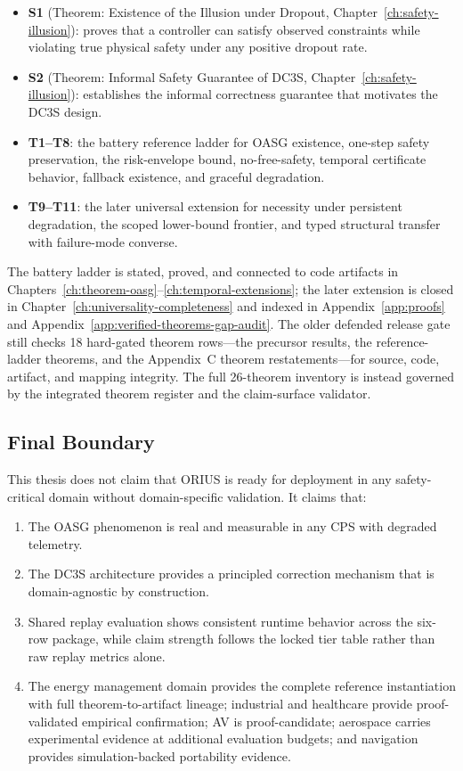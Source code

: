 \begin{itemize}
  \item \textbf{S1} (Theorem: Existence of the Illusion under Dropout,
    Chapter~\ref{ch:safety-illusion}): proves that a
    controller can satisfy observed constraints while violating true
    physical safety under any positive dropout rate.
  \item \textbf{S2} (Theorem: Informal Safety Guarantee of DC3S,
    Chapter~\ref{ch:safety-illusion}): establishes the
    informal correctness guarantee that motivates the DC3S design.
  \item \textbf{T1--T8}: the battery reference ladder for OASG existence,
    one-step safety preservation, the risk-envelope bound, no-free-safety,
    temporal certificate behavior, fallback existence, and graceful
    degradation.
  \item \textbf{T9--T11}: the later universal extension for necessity under
    persistent degradation, the scoped lower-bound frontier, and typed
    structural transfer with failure-mode converse.
\end{itemize}

The battery ladder is stated, proved, and connected to code artifacts in
Chapters~\ref{ch:theorem-oasg}--\ref{ch:temporal-extensions}; the later
extension is closed in Chapter~\ref{ch:universality-completeness} and indexed
in Appendix~\ref{app:proofs} and
Appendix~\ref{app:verified-theorems-gap-audit}.  The older defended release
gate still checks 18 hard-gated theorem rows---the precursor results, the
reference-ladder theorems, and the Appendix~C theorem restatements---for
source, code, artifact, and mapping integrity.  The full 26-theorem
inventory is instead governed by the integrated theorem register and the
claim-surface validator.

\subsection{Final Boundary}

This thesis does not claim that ORIUS is ready for deployment in any
safety-critical domain without domain-specific validation.  It claims
that:

\begin{enumerate}
  \item The OASG phenomenon is real and measurable in any CPS with
    degraded telemetry.
  \item The DC3S architecture provides a principled correction mechanism
    that is domain-agnostic by construction.
  \item Shared replay evaluation shows consistent runtime behavior across
    the six-row package, while claim strength follows the locked tier table
    rather than raw replay metrics alone.
  \item The energy management domain provides the complete reference
    instantiation with full theorem-to-artifact lineage; industrial and
    healthcare provide proof-validated empirical confirmation; AV is
    proof-candidate; aerospace carries experimental evidence at additional
    evaluation budgets;
    and navigation provides simulation-backed portability evidence.
\end{enumerate}

